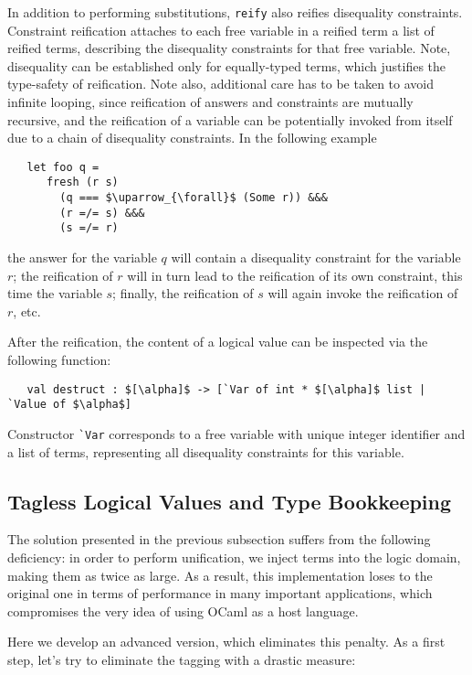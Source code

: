 In addition to performing substitutions, \lstinline{reify} also reifies disequality constraints. Constraint reification
attaches to each free variable in a reified term a list of reified terms, describing the disequality constraints for that
free variable. Note, disequality can be established only for equally-typed terms, which justifies the type-safety of reification.
Note also, additional care has to be taken to avoid infinite looping, since reification of answers and constraints are
mutually recursive, and the reification of a variable can be potentially invoked from itself due to a chain of disequality
constraints. In the following example

\begin{lstlisting}
   let foo q =
      fresh (r s)
        (q === $\uparrow_{\forall}$ (Some r)) &&&
        (r =/= s) &&&
        (s =/= r)
\end{lstlisting}

\noindent the answer for the variable $q$ will contain a disequality constraint for the variable $r$; the reification of $r$ will in turn
lead to the reification of its own constraint, this time the variable $s$; finally, the reification of $s$ will again invoke the
reification of $r$, etc.

After the reification, the content of a logical value can be inspected via the following function:

\begin{lstlisting}
   val destruct : $[\alpha]$ -> [`Var of int * $[\alpha]$ list | `Value of $\alpha$]
\end{lstlisting}

Constructor \lstinline{`Var} corresponds to a free variable with unique integer identifier and a list of terms,
representing all disequality constraints for this variable.

\subsection{Tagless Logical Values and Type Bookkeeping}

The solution presented in the previous subsection suffers from the following deficiency: in order to perform unification,
we inject terms into the logic domain, making them as twice as large. As a result, this implementation loses to the original one in
terms of performance in many important applications, which compromises the very idea of using OCaml as a host language.

Here we develop an advanced version, which eliminates this penalty. As a first step, let's try to eliminate the tagging with
a drastic measure:

